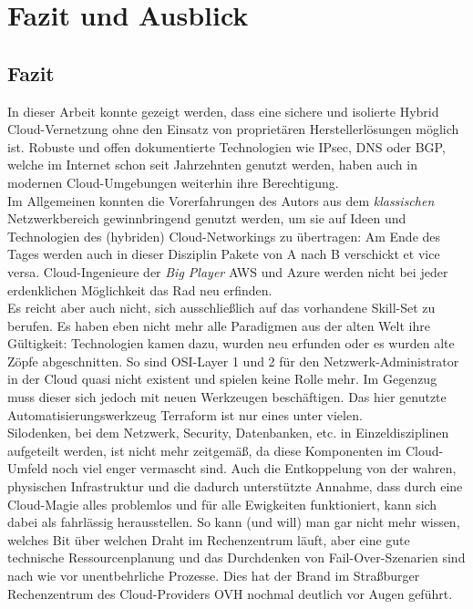 \chapter{Fazit und Ausblick} \label{Fazit und Ausblick}

\section{Fazit}

In dieser Arbeit konnte gezeigt werden, dass eine sichere und isolierte Hybrid Cloud-Vernetzung ohne den Einsatz von proprietären Herstellerlösungen möglich ist. Robuste und offen dokumentierte Technologien wie IPsec, DNS oder BGP, welche im Internet schon seit Jahrzehnten genutzt werden, haben auch in \glqq modernen\grqq{} Cloud-Umgebungen weiterhin ihre Berechtigung.\\
Im Allgemeinen konnten die Vorerfahrungen des Autors aus dem \textit{klassischen} Netzwerkbereich gewinnbringend genutzt werden, um sie auf Ideen und Technologien des (hybriden) Cloud-Networkings zu übertragen: Am Ende des Tages werden auch in dieser Disziplin Pakete von A nach B verschickt et vice versa. Cloud-Ingenieure der \textit{Big Player} AWS und Azure werden nicht bei jeder erdenklichen Möglichkeit das Rad neu erfinden.\\
Es reicht aber auch nicht, sich ausschließlich auf das vorhandene Skill-Set zu berufen. Es haben eben nicht mehr alle Paradigmen aus der \glqq alten Welt\grqq{} ihre Gültigkeit: Technologien kamen dazu, wurden neu erfunden oder es wurden alte Zöpfe abgeschnitten. So sind OSI-Layer 1 und 2 für den Netzwerk-Administrator in der Cloud quasi nicht existent und spielen keine Rolle mehr. Im Gegenzug muss dieser sich jedoch mit neuen Werkzeugen beschäftigen. Das hier genutzte Automatisierungswerkzeug Terraform ist nur eines unter vielen.\\
Silodenken, bei dem Netzwerk, Security, Datenbanken, etc. in Einzeldisziplinen aufgeteilt werden, ist nicht mehr zeitgemäß, da diese Komponenten im Cloud-Umfeld noch viel enger vermascht sind. Auch die Entkoppelung von der \glqq wahren\grqq{}, physischen Infrastruktur und die dadurch unterstützte Annahme, dass durch eine \glqq Cloud-Magie\grqq{} alles problemlos und für alle Ewigkeiten funktioniert, kann sich dabei als fahrlässig herausstellen. So kann (und will) man gar nicht mehr wissen, \glqq welches Bit über welchen Draht im Rechenzentrum läuft\grqq{}, aber eine gute technische Ressourcenplanung und das Durchdenken von Fail-Over-Szenarien sind nach wie vor unentbehrliche Prozesse. Dies hat der Brand im Straßburger Rechenzentrum des Cloud-Providers OVH nochmal deutlich vor Augen geführt.\\
